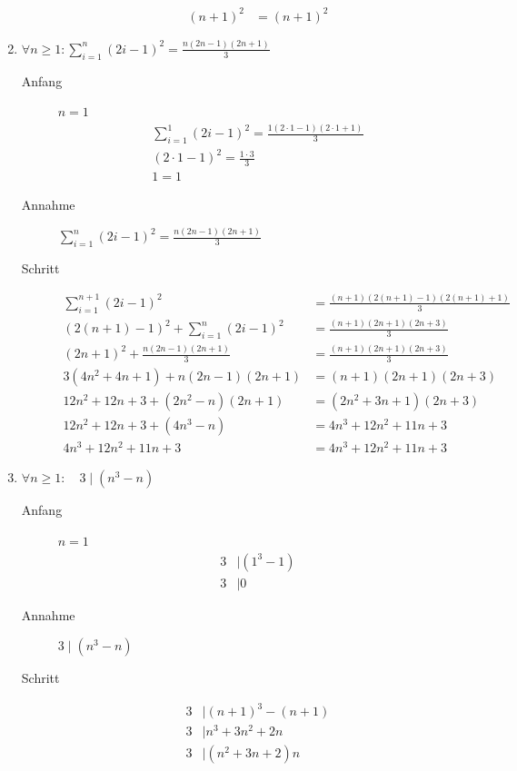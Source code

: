 \documentclass[11pt, a4paper]{article}
\begin{document}
\begin{enumerate}
\begin{description}
\begin{align*}
					(n+1)^2 &= (n+1)^2
				\end{align*}
		\end{description}
	\item $\forall n \geq 1 : \sum_{i=1}^n (2i-1)^2 = \frac{n (2n-1)(2n+1)}{3}$
		\begin{description}
			\item[Anfang] $n=1$
				\begin{align*}
					\sum_{i=1}^1 (2i-1)^2 = \frac{1 (2 \cdot 1-1)(2 \cdot 1 +1)}{3} \\
					(2 \cdot 1-1)^2 = \frac{1 \cdot 3}{3} \\
					1 = 1
				\end{align*}
			\item[Annahme] $\sum_{i=1}^n (2i-1)^2 = \frac{n (2n-1)(2n+1)}{3}$
			\item[Schritt] 
				\begin{align*}
					\sum_{i=1}^{n+1} (2i-1)^2 &= \frac{(n+1) (2(n+1)-1)(2(n+1)+1)}{3} \\
					(2(n+1)-1)^2 + \sum_{i=1}^n (2i-1)^2 &= \frac{(n+1)(2n+1)(2n+3)}{3} \\
					(2n+1)^2 + \frac{n(2n-1)(2n+1)}{3} &= \frac{(n+1)(2n+1)(2n+3)}{3} \\
					3(4n^2+4n+1) + n(2n-1)(2n+1) &= (n+1)(2n+1)(2n+3) \\
					12n^2+12n+3 + (2n^2-n)(2n+1) &= (2n^2+3n+1)(2n+3) \\
					12n^2+12n+3 + (4n^3-n) &= 4n^3+12n^2+11n+3 \\
					4n^3+12n^2+11n+3 &= 4n^3+12n^2+11n+3
				\end{align*}
		\end{description}
	\item $\forall n \geq 1 : \quad 3 \mid (n^3 - n)$
		\begin{description}
			\item[Anfang] $n=1$
				\begin{align*}
					3 &\mid (1^3 - 1) \\
					3 &\mid 0
				\end{align*}
			\item[Annahme] $3 \mid (n^3 - n)$
			\item[Schritt] 
			\begin{align*}
				3 &\mid (n+1)^3 - (n+1) \tag{Ausmultiplizieren} \\
				3 &\mid n^3+3n^2+2n \tag{$n$ ausklammern} \\
				3 &\mid (n^2+3n+2)n \tag{Linearfaktorzerlegung} \\

\end{align*}
\end{description}
\end{enumerate}
\end{document}
